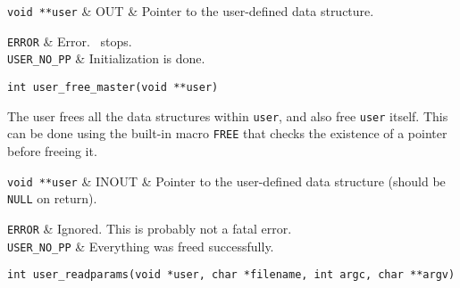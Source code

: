 {\tt void **user} & OUT & Pointer to the user-defined data structure. \\
\et

\returns

{\tt ERROR} & Error. \BB\ stops. \\
{\tt USER\_NO\_PP} & Initialization is done. \\
\et

\ed

\vspace{1ex}


\begin{verbatim}
int user_free_master(void **user)
\end{verbatim}

\bd

\describe

The user frees all the data structures within {\tt *user}, and
also free {\tt *user} itself. This can be done using the built-in macro
{\tt FREE} that checks the existence of a pointer before freeing it.

\args

{\tt void **user} & INOUT & Pointer to the user-defined data structure
(should be {\tt NULL} on return). \\
\et

\returns

{\tt ERROR} & Ignored. This is probably not a fatal error.\\
{\tt USER\_NO\_PP} & Everything was freed successfully. \\
\et

\ed

\vspace{1ex}


\label{user_readparams}
\begin{verbatim}
int user_readparams(void *user, char *filename, int argc, char **argv)
\end{verbatim}

\bd


